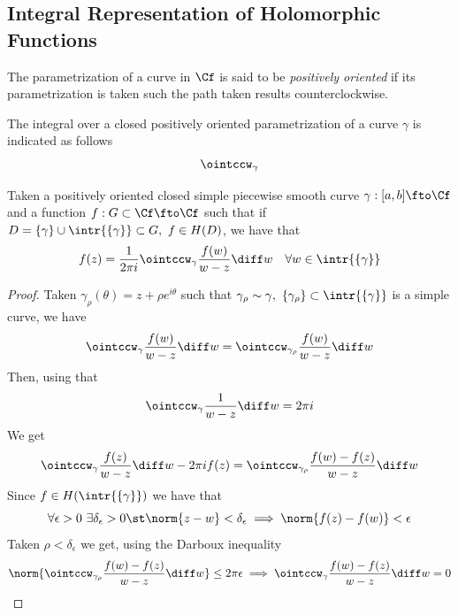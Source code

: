\documentclass[../mmf.tex]{subfiles}
\begin{document}
\subsection{Integral Representation of Holomorphic Functions}
\begin{dfn}
	The parametrization of a curve in $\Cf$ is said to be \textit{positively oriented} if its parametrization is taken such the path taken results counterclockwise.
\end{dfn}
\begin{ntn}
	The integral over a closed positively oriented parametrization of a curve $\gamma$ is indicated as follows
	\begin{equation*}
		\ointccw_\gamma
	\end{equation*}
\end{ntn}
\begin{thm}
	Taken a positively oriented closed simple piecewise smooth curve $\gamma:[a,b]\fto\Cf$ and a function $f:G\subset\Cf\fto\Cf$ such that if $D=\{\gamma\}\cup\intr{\{\gamma\}}\subset G,\ f\in H(D)$, we have that
	\begin{equation}
		f(z)=\frac{1}{2\pi i}\ointccw_\gamma\frac{f(w)}{w-z}\diff w\quad\forall w\in\intr{\{\gamma\}}
		\label{eq:cauchyintegral}
	\end{equation}
\end{thm}
\begin{proof}
	Taken $\gamma_\rho(\theta)=z+\rho e^{i\theta}$ such that $\gamma_\rho\sim\gamma,\ \{\gamma_\rho\}\subset\intr{\{\gamma\}}$ is a simple curve, we have
	\begin{equation*}
		\ointccw_{\gamma}\frac{f(w)}{w-z}\diff w=\ointccw_{\gamma_\rho}\frac{f(w)}{w-z}\diff w
	\end{equation*}
	Then, using that
	\begin{equation*}
		\ointccw_{\gamma}\frac{1}{w-z}\diff w=2\pi i
	\end{equation*}
	We get
	\begin{equation*}
		\ointccw_{\gamma}\frac{f(z)}{w-z}\diff w-2\pi if(z)=\ointccw_{\gamma_\rho}\frac{f(w)-f(z)}{w-z}\diff w
	\end{equation*}
	Since $f\in H(\intr{\{\gamma\}})$ we have that
	\begin{equation*}
		\forall\epsilon>0\ \exists\delta_\epsilon>0\st\norm{z-w}<\delta_\epsilon\implies{}\norm{f(z)-f(w)}<\epsilon
	\end{equation*}
	Taken $\rho<\delta_\epsilon$ we get, using the Darboux inequality
	\begin{equation*}
		\norm{\ointccw_{\gamma_\rho}\frac{f(w)-f(z)}{w-z}\diff w}\le 2\pi\epsilon\implies{}\ointccw_{\gamma}\frac{f(w)-f(z)}{w-z}\diff w=0
	\end{equation*}
\end{proof}
\end{document}
